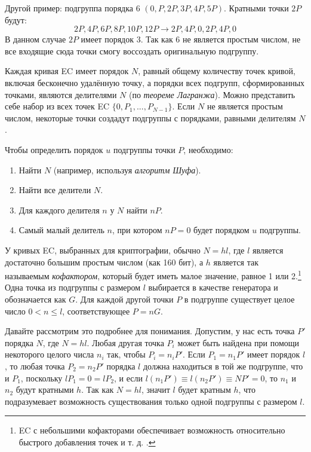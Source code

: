 Другой пример: подгруппа порядка 6 $(0, P, 2P, 3P, 4P, 5P)$. Кратными точки $2P$ будут:\vspace{.175cm}
\[2P, 4P, 6P, 8P, 10P, 12P \rightarrow 2P, 4P, 0, 2P, 4P, 0\]
В данном случае $2P$ имеет порядок 3. Так как 6 не является простым числом, не все входящие сюда точки смогу воссоздать оригинальную подгруппу.

Каждая кривая EC имеет порядок $N$, равный общему количеству точек кривой, включая бесконечно удалённую точку, а порядки всех подгрупп, сформированных точками, являются делителями $N$ (по {\em теореме Лагранжа}). Можно представить себе набор из всех точек EC $\{0,P_1,...,P_{N-1}\}$. Если $N$ не является простым числом, некоторые точки создадут подгруппы с порядками, равными делителям $N$.

Чтобы определить порядок $u$ подгруппы точки $P$, необходимо:
\begin{enumerate}
    \item Найти $N$ (например, используя {\em алгоритм Шуфа}).
    \item Найти все делители $N$.
    \item Для каждого делителя $n$ у $N$ найти $n P$.
    \item Самый малый делитель $n$, при котором $n P = 0$ будет порядком $u$ подгруппы.
\end{enumerate} 

У кривых EC, выбранных для криптографии, обычно $N = hl$, где $l$ является достаточно большим простым числом (как 160 бит), а $h$ является так называемым {\em кофактором}, который будет иметь малое значение, равное 1 или 2.\footnote{EC с небольшими кофакторами обеспечивает возможность относительно быстрого добавления точек и т. д. \cite{Bernstein2008}.} Одна точка из подгруппы с размером $l$ выбирается в качестве генератора и обозначается как $G$. Для каждой другой точки $P$ в подгруппе существует целое число $0 < n \leq l$, соответствующее $P = n G$.

Давайте рассмотрим это подробнее для понимания. Допустим, у нас есть точка $P'$ порядка $N$, где $N=h l$. Любая другая точка $P_i$ может быть найдена при помощи некоторого целого числа $n_i$ так, чтобы $P_i=n_i P'$. Если $P_1=n_1 P'$ имеет порядок $l$, то любая точка $P_2=n_2 P'$ порядка $l$ должна находиться в той же подгруппе, что и $P_1$, поскольку $l P_1=0 = l P_2$, и если $l(n_1 P') \equiv l(n_2 P') \equiv N P'=0$, то $n_1$ и $n_2$ будут кратными $h$. Так как $N= h l$, значит $l$ будет кратным  $h$, что подразумевает возможность существования только одной подгруппы с размером $l$.

